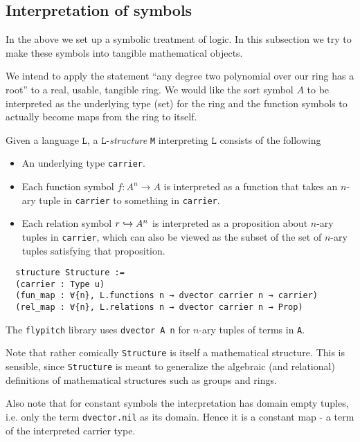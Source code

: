 \subsection{Interpretation of symbols}

In the above we set up a symbolic treatment of logic.
In this subsection we try to make these symbols into tangible mathematical objects.

We intend to apply the statement
``any degree two polynomial over our ring has a root''
to a real, usable, tangible ring.
We would like the sort symbol $A$ to be interpreted as the underlying type (set)
for the ring and the function symbols to actually become maps from the ring to itself.

\begin{dfn}[Structures]
    Given a language $\texttt{L}$, a $\texttt{L}$-\textit{structure} \texttt{M}
    interpreting $\texttt{L}$ consists of the following
    \begin{itemize}
      \item An underlying type \texttt{carrier}.
      \item Each function symbol $f : A^{n} \to A$ is interpreted as a
            function that takes an $n$-ary tuple in \texttt{carrier}
            to something in \texttt{carrier}.
      \item Each relation symbol $r \hookrightarrow A^{n}$
            is interpreted as a proposition about $n$-ary tuples in \texttt{carrier},
            which can also be viewed as the subset of the set of $n$-ary tuples
            satisfying that proposition.
    \end{itemize}

  \begin{lstlisting}
  structure Structure :=
  (carrier : Type u)
  (fun_map : ∀{n}, L.functions n → dvector carrier n → carrier)
  (rel_map : ∀{n}, L.relations n → dvector carrier n → Prop)\end{lstlisting}

  The \texttt{flypitch} library uses \texttt{dvector A n} for $n$-ary tuples of terms in \texttt{A}.

  Note that rather comically \texttt{Structure} is itself a mathematical structure.
  This is sensible, since \texttt{Structure} is meant to generalize the algebraic
  (and relational) definitions of mathematical structures such as groups and rings.

  Also note that for constant symbols the interpretation has domain empty tuples,
  i.e. only the term \texttt{dvector.nil} as its domain. Hence it is a constant map
  - a term of the interpreted carrier type.
\end{dfn}

